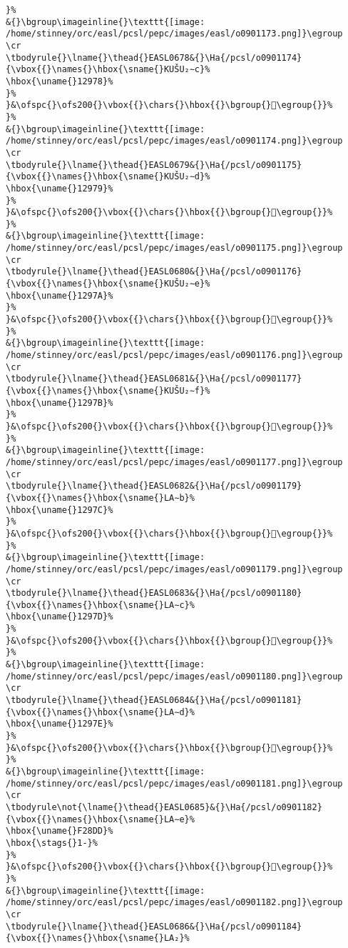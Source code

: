 \begin{verbatim}
}%
&{}\bgroup\imageinline{}\texttt{[image: /home/stinney/orc/easl/pcsl/pepc/images/easl/o0901173.png]}\egroup
\cr
\tbodyrule{}\lname{}\thead{}EASL0678&{}\Ha{/pcsl/o0901174}{\vbox{{}\names{}\hbox{\sname{}KUŠU₂∼c}%
\hbox{\uname{}12978}%
}%
}&\ofspc{}\ofs200{}\vbox{{}\chars{}\hbox{{}\bgroup{}𒥸\egroup{}}%
}%
&{}\bgroup\imageinline{}\texttt{[image: /home/stinney/orc/easl/pcsl/pepc/images/easl/o0901174.png]}\egroup
\cr
\tbodyrule{}\lname{}\thead{}EASL0679&{}\Ha{/pcsl/o0901175}{\vbox{{}\names{}\hbox{\sname{}KUŠU₂∼d}%
\hbox{\uname{}12979}%
}%
}&\ofspc{}\ofs200{}\vbox{{}\chars{}\hbox{{}\bgroup{}𒥹\egroup{}}%
}%
&{}\bgroup\imageinline{}\texttt{[image: /home/stinney/orc/easl/pcsl/pepc/images/easl/o0901175.png]}\egroup
\cr
\tbodyrule{}\lname{}\thead{}EASL0680&{}\Ha{/pcsl/o0901176}{\vbox{{}\names{}\hbox{\sname{}KUŠU₂∼e}%
\hbox{\uname{}1297A}%
}%
}&\ofspc{}\ofs200{}\vbox{{}\chars{}\hbox{{}\bgroup{}𒥺\egroup{}}%
}%
&{}\bgroup\imageinline{}\texttt{[image: /home/stinney/orc/easl/pcsl/pepc/images/easl/o0901176.png]}\egroup
\cr
\tbodyrule{}\lname{}\thead{}EASL0681&{}\Ha{/pcsl/o0901177}{\vbox{{}\names{}\hbox{\sname{}KUŠU₂∼f}%
\hbox{\uname{}1297B}%
}%
}&\ofspc{}\ofs200{}\vbox{{}\chars{}\hbox{{}\bgroup{}𒥻\egroup{}}%
}%
&{}\bgroup\imageinline{}\texttt{[image: /home/stinney/orc/easl/pcsl/pepc/images/easl/o0901177.png]}\egroup
\cr
\tbodyrule{}\lname{}\thead{}EASL0682&{}\Ha{/pcsl/o0901179}{\vbox{{}\names{}\hbox{\sname{}LA∼b}%
\hbox{\uname{}1297C}%
}%
}&\ofspc{}\ofs200{}\vbox{{}\chars{}\hbox{{}\bgroup{}𒥼\egroup{}}%
}%
&{}\bgroup\imageinline{}\texttt{[image: /home/stinney/orc/easl/pcsl/pepc/images/easl/o0901179.png]}\egroup
\cr
\tbodyrule{}\lname{}\thead{}EASL0683&{}\Ha{/pcsl/o0901180}{\vbox{{}\names{}\hbox{\sname{}LA∼c}%
\hbox{\uname{}1297D}%
}%
}&\ofspc{}\ofs200{}\vbox{{}\chars{}\hbox{{}\bgroup{}𒥽\egroup{}}%
}%
&{}\bgroup\imageinline{}\texttt{[image: /home/stinney/orc/easl/pcsl/pepc/images/easl/o0901180.png]}\egroup
\cr
\tbodyrule{}\lname{}\thead{}EASL0684&{}\Ha{/pcsl/o0901181}{\vbox{{}\names{}\hbox{\sname{}LA∼d}%
\hbox{\uname{}1297E}%
}%
}&\ofspc{}\ofs200{}\vbox{{}\chars{}\hbox{{}\bgroup{}𒥾\egroup{}}%
}%
&{}\bgroup\imageinline{}\texttt{[image: /home/stinney/orc/easl/pcsl/pepc/images/easl/o0901181.png]}\egroup
\cr
\tbodyrule\not{\lname{}\thead{}EASL0685}&{}\Ha{/pcsl/o0901182}{\vbox{{}\names{}\hbox{\sname{}LA∼e}%
\hbox{\uname{}F28DD}%
\hbox{\stags{}1-}%
}%
}&\ofspc{}\ofs200{}\vbox{{}\chars{}\hbox{{}\bgroup{}󲣝\egroup{}}%
}%
&{}\bgroup\imageinline{}\texttt{[image: /home/stinney/orc/easl/pcsl/pepc/images/easl/o0901182.png]}\egroup
\cr
\tbodyrule{}\lname{}\thead{}EASL0686&{}\Ha{/pcsl/o0901184}{\vbox{{}\names{}\hbox{\sname{}LA₂}%

\end{verbatim}
